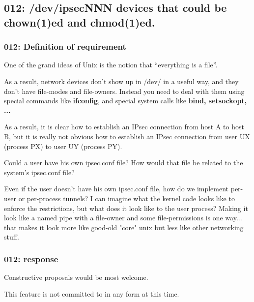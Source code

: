 \subsection{012: /dev/ipsecNNN devices that could be chown(1)ed and chmod(1)ed.}

\subsubsection{012: Definition of requirement }

One of the grand ideas of Unix is the notion that ``everything is a file''.  

As a result, network devices don't show up in /dev/ in a useful way, and they
don't have file-modes and file-owners.  Instead you need to deal with them
using special commands like {\bf ifconfig}, and special system calls like
{\bf bind, setsockopt, ...}

As a result, it is clear how to establish an IPsec connection from host A to 
host B, but it is really not obvious how to establish an IPsec connection 
from user UX (process PX) to user UY (process PY).  

Could a user have his own ipsec.conf file?  
How would that file be related to the system's ipsec.conf file?

Even if the user doesn't have his own ipsec.conf file, how do we implement 
per-user or per-process tunnels?  I can imagine what the kernel code looks 
like to enforce the restrictions, but what does it look like to the user 
process?  Making it look like a named pipe with a file-owner and some 
file-permissions is one way... that makes it look more like good-old "core" 
unix but less like other networking stuff.  

\subsubsection{012: response}

Constructive proposals would be most welcome.

This feature is not committed to in any form at this time.




